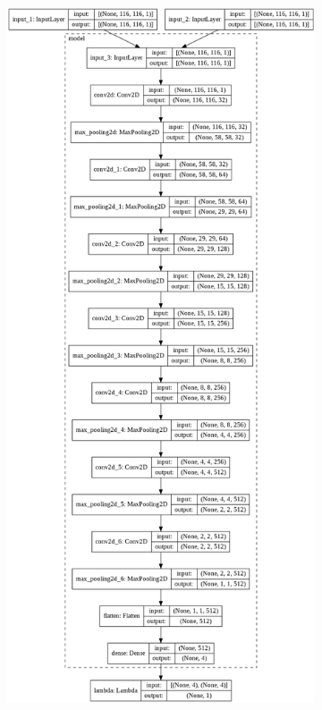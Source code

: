 \begin{figure}[ht!]
    \centering
    \begin{subfigure}[t]{0.47\linewidth}
        \includegraphics[width=\linewidth]{figures/model_plot_4d.png}

\end{subfigure}
\end{figure}
